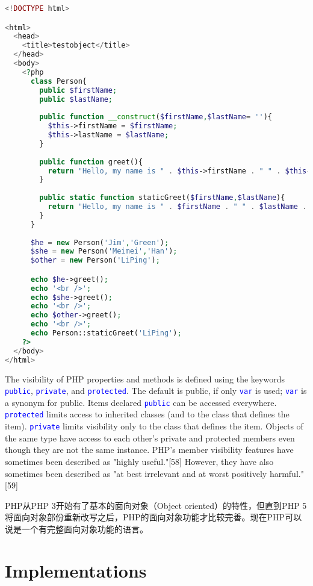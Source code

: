 \begin{lstlisting}[language=PHP]
<!DOCTYPE html>

<html>
  <head>
    <title>testobject</title>
  </head>
  <body>
    <?php
      class Person{
        public $firstName;
        public $lastName;
        
        public function __construct($firstName,$lastName= ''){
          $this->firstName = $firstName;
          $this->lastName = $lastName;
        }
        
        public function greet(){
          return "Hello, my name is " . $this->firstName . " " . $this->lastName . ".";
        }
        
        public static function staticGreet($firstName,$lastName){
          return "Hello, my name is " . $firstName . " " . $lastName . "."; 
        }
      }
      
      $he = new Person('Jim','Green');
      $she = new Person('Meimei','Han');
      $other = new Person('LiPing');

      echo $he->greet();
      echo '<br />';
      echo $she->greet();
      echo '<br />';
      echo $other->greet();
      echo '<br />';
      echo Person::staticGreet('LiPing');
    ?>
  </body>
</html>
\end{lstlisting}

The visibility of PHP properties and methods is defined using the keywords \textcolor{Blue}{\texttt{public}}, \textcolor{Blue}{\texttt{private}}, and \textcolor{Blue}{\texttt{protected}}. The default is public, if only \textcolor{Blue}{\texttt{var}} is used; \textcolor{Blue}{\texttt{var}} is a synonym for public. Items declared \textcolor{Blue}{\texttt{public}} can be accessed everywhere. \textcolor{Blue}{\texttt{protected}} limits access to inherited classes (and to the class that defines the item). \textcolor{Blue}{\texttt{private}} limits visibility only to the class that defines the item. Objects of the same type have access to each other's private and protected members even though they are not the same instance. PHP's member visibility features have sometimes been described as "highly useful."[58] However, they have also sometimes been described as "at best irrelevant and at worst positively harmful."[59]


PHP从PHP 3开始有了基本的面向对象（Object oriented）的特性，但直到PHP 5将面向对象部份重新改写之后，PHP的面向对象功能才比较完善。现在PHP可以说是一个有完整面向对象功能的语言。

\chapter{Implementations}


